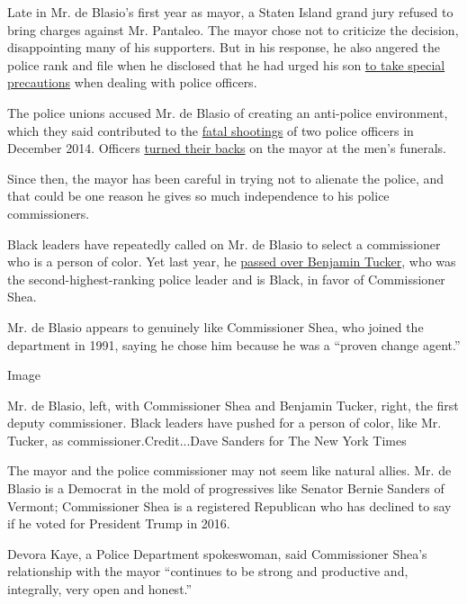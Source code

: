 Late in Mr. de Blasio's first year as mayor, a Staten Island grand jury
refused to bring charges against Mr. Pantaleo. The mayor chose not to
criticize the decision, disappointing many of his supporters. But in his
response, he also angered the police rank and file when he disclosed
that he had urged his son
\href{http://www.nytimes.com/2014/12/04/nyregion/de-blasio-reacts-as-mayor-and-a-father-to-chokehold-case-decision.html?_r=0}{to
take special precautions} when dealing with police officers.

The police unions accused Mr. de Blasio of creating an anti-police
environment, which they said contributed to the
\href{https://www.nytimes.com/2014/12/21/nyregion/two-police-officers-shot-in-their-patrol-car-in-brooklyn.html}{fatal
shootings} of two police officers in December 2014. Officers
\href{https://www.nytimes.com/2015/01/05/nyregion/police-officers-gather-for-the-funeral-of-wenjian-liu-killed-in-an-ambush.html}{turned
their backs} on the mayor at the men's funerals.

Since then, the mayor has been careful in trying not to alienate the
police, and that could be one reason he gives so much independence to
his police commissioners.

Black leaders have repeatedly called on Mr. de Blasio to select a
commissioner who is a person of color. Yet last year, he
\href{https://www.nytimes.com/2019/11/05/nyregion/nypd-police-commissioner-de-blasio.html}{passed
over Benjamin Tucker}, who was the second-highest-ranking police leader
and is Black, in favor of Commissioner Shea.

Mr. de Blasio appears to genuinely like Commissioner Shea, who joined
the department in 1991, saying he chose him because he was a ``proven
change agent.''

Image

Mr. de Blasio, left, with Commissioner Shea and Benjamin Tucker, right,
the first deputy commissioner. Black leaders have pushed for a person of
color, like Mr. Tucker, as commissioner.Credit...Dave Sanders for The
New York Times

The mayor and the police commissioner may not seem like natural allies.
Mr. de Blasio is a Democrat in the mold of progressives like Senator
Bernie Sanders of Vermont; Commissioner Shea is a registered Republican
who has declined to say if he voted for President Trump in 2016.

Devora Kaye, a Police Department spokeswoman, said Commissioner Shea's
relationship with the mayor ``continues to be strong and productive and,
integrally, very open and honest.''

